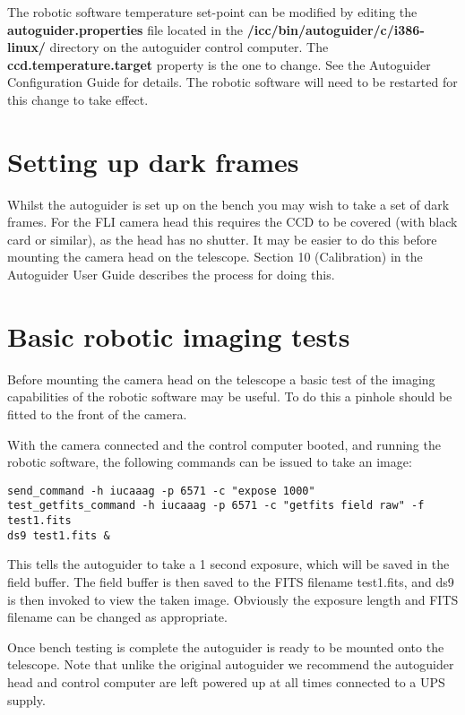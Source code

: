 \documentclass[10pt,a4paper]{article}
\begin{document}
The robotic software temperature set-point can be modified by editing the {\bf autoguider.properties} file located in the {\bf /icc/bin/autoguider/c/i386-linux/} directory on the autoguider control computer. The {\bf ccd.temperature.target } property is the one to change. See the Autoguider Configuration Guide \cite{bib:autoguiderconfigurationguide} for details. The robotic software will need to be restarted for this change to take effect.

\section{Setting up dark frames}

Whilst the autoguider is set up on the bench you may wish to take a set of dark frames. For the FLI camera head this requires the CCD to be covered (with black card or similar), as the head has no shutter. It may be easier to do this before mounting the camera head on the telescope. Section 10 (Calibration) in the Autoguider User Guide \cite{bib:autoguideruserguide} describes the process for doing this.

\section{Basic robotic imaging tests}
\label{sec:basicroboticimaging}

Before mounting the camera head on the telescope a basic test of the imaging capabilities of the robotic software may be useful. To do this a pinhole should be fitted to the front of the camera.

With the camera connected and the control computer booted, and running the robotic software, the following commands can be issued to take an image:

\begin{verbatim}
send_command -h iucaaag -p 6571 -c "expose 1000"
test_getfits_command -h iucaaag -p 6571 -c "getfits field raw" -f test1.fits
ds9 test1.fits &
\end{verbatim}

This tells the autoguider to take a 1 second exposure, which will be saved in the field buffer. The field buffer is then saved to the FITS filename test1.fits, and ds9 is then invoked to view the taken image. Obviously the exposure length and FITS filename can be changed as appropriate.

Once bench testing is complete the autoguider is ready to be mounted
onto the telescope.  Note that unlike the original autoguider we recommend the autoguider head and
control computer are left powered up at all times connected to a UPS supply.
\end{document}
